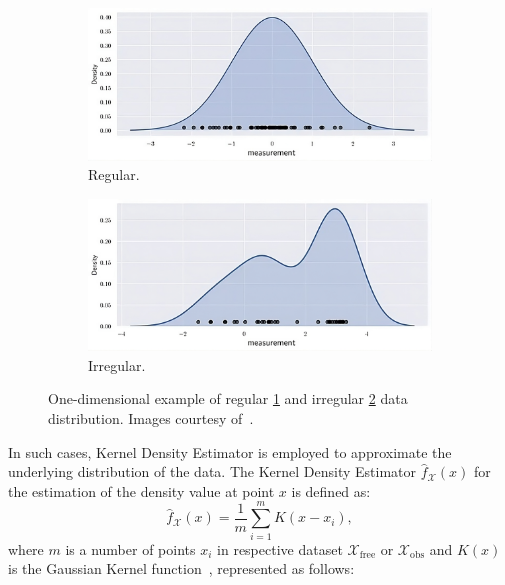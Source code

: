 \documentclass{ctuthesis}
\begin{document}
\begin{figure}[!ht]
  \centering 
  \begin{subfigure}[b]{1\textwidth}
      \includegraphics[width=\textwidth]{figChap4/regular-transformed.jpeg}
      \caption{Regular.}
      \label{fig:reg}
  \end{subfigure}  
  \begin{subfigure}[b]{1\textwidth}
      \includegraphics[width=\textwidth]{figChap4/irregular-transformed.jpeg}
      \caption{Irregular.}
      \label{fig:irreg}
  \end{subfigure}
  \caption{One-dimensional example of regular \ref{fig:reg} and irregular \ref{fig:irreg} 
  data distribution.
  Images courtesy of~\cite{Jaroslaw2023KDEexplain}.}
  \label{fig:DataDistribution}
\end{figure}
In such cases, 
Kernel Density Estimator is employed to approximate the underlying distribution of the data. 
The Kernel Density Estimator \( \hat{f}_\mathcal{X}(x) \) 
for the estimation of the density value at point \( x \) is defined as:
\[ \hat{f}_\mathcal{X}(x) = \frac{1}{m} \sum_{i=1}^{m} K \left( x - x_{i} \right), \]
where $m$ is a number of points $x_i$ in respective dataset $\mathcal{X}_\text{free}$ or $\mathcal{X}_\text{obs}$ and
\( K(x) \) is the Gaussian Kernel function~\cite{Jaroslaw2023KDEmultidimensional}, represented as follows:
\end{document}
